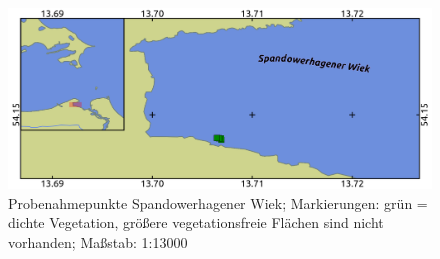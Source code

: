 \begin{figure}[htb]
\centering
\includegraphics[width=1\textwidth]{images/SW}
\caption[Probenahmepunkte Spandowerhagener Wiek]{Probenahmepunkte Spandowerhagener Wiek; Markierungen: grün = dichte Vegetation, größere vegetationsfreie Flächen sind nicht vorhanden; Maßstab: 1:13000}
\label{SW}
\end{figure}



